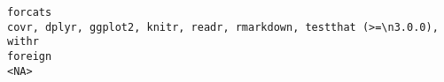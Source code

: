 \documentclass[
  letterpaper,
  DIV=11,
  numbers=noendperiod]{scrreprt}
\begin{document}
\begin{verbatim}
forcats                                                                                                                                                                                                                                                                                                                                                                                                                                                                                                                                                                                                                                                                                                                                                                                                                                                                                                                                                                                                                                                                                                                                                                                                                            covr, dplyr, ggplot2, knitr, readr, rmarkdown, testthat (>=\n3.0.0), withr
foreign                                                                                                                                                                                                                                                                                                                                                                                                                                                                                                                                                                                                                                                                                                                                                                                                                                                                                                                                                                                                                                                                                                                                                                                                                                                                                                  <NA>

\end{verbatim}
\end{document}
